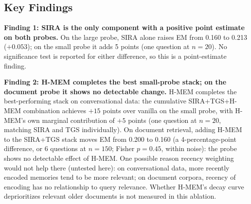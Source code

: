 \documentclass[11pt,a4paper]{article}
\begin{document}
\begin{table}[H]
\centering
\caption{Main ablation results. Bold indicates best performance in column. Each row reflects the cumulative stack from the row above plus the named component.}
\label{tab:ablation}
\end{table}

\subsection{Key Findings}

\textbf{Finding 1: SIRA is the only component with a positive point estimate on both probes.}
On the large probe, SIRA alone raises EM from 0.160 to 0.213 ($+0.053$); on the small probe it adds 5 points (one question at $n=20$). No significance test is reported for either difference, so this is a point-estimate finding.

\textbf{Finding 2: H-MEM completes the best small-probe stack; on the document probe it shows no detectable change.}
H-MEM completes the best-performing stack on conversational data: the cumulative SIRA+TGS+H-MEM combination achieves $+15$ points over vanilla on the small probe, with H-MEM's own marginal contribution of $+5$ points (one question at $n=20$, matching SIRA and TGS individually). On document retrieval, adding H-MEM to the SIRA+TGS stack moves EM from 0.200 to 0.160 (a 4-percentage-point difference, or 6 questions at $n=150$; Fisher $p=0.45$, within noise): the probe shows no detectable effect of H-MEM. One possible reason recency weighting would not help there (untested here): on conversational data, more recently encoded memories tend to be more relevant; on document corpora, recency of encoding has no relationship to query relevance. Whether H-MEM's decay curve deprioritizes relevant older documents is not measured in this ablation.
\end{document}
